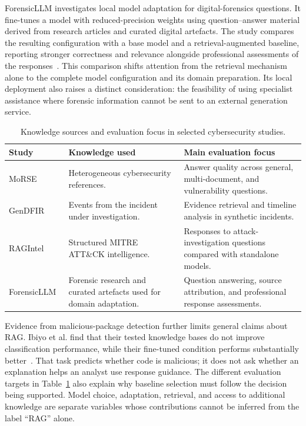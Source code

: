 ForensicLLM investigates local model adaptation for digital-forensics questions. It fine-tunes a model with reduced-precision weights using question--answer material derived from research articles and curated digital artefacts. The study compares the resulting configuration with a base model and a retrieval-augmented baseline, reporting stronger correctness and relevance alongside professional assessments of the responses~\cite{ref030}. This comparison shifts attention from the retrieval mechanism alone to the complete model configuration and its domain preparation. Its local deployment also raises a distinct consideration: the feasibility of using specialist assistance where forensic information cannot be sent to an external generation service.

\begin{table}[htbp]
\centering\small
\caption{Knowledge sources and evaluation focus in selected cybersecurity studies.}
\label{tab:literature-systems}
\begin{tabularx}{\textwidth}{@{}>{\raggedright\arraybackslash}p{}>{\raggedright\arraybackslash}X>{\raggedright\arraybackslash}X@{}}
\toprule
Study & Knowledge used & Main evaluation focus \\
\midrule
MoRSE~\cite{ref001} & Heterogeneous cybersecurity references. & Answer quality across general, multi-document, and vulnerability questions. \\
GenDFIR~\cite{ref011} & Events from the incident under investigation. & Evidence retrieval and timeline analysis in synthetic incidents. \\
RAGIntel~\cite{ref033} & Structured MITRE ATT\&CK intelligence. & Responses to attack-investigation questions compared with standalone models. \\
ForensicLLM~\cite{ref030} & Forensic research and curated artefacts used for domain adaptation. & Question answering, source attribution, and professional response assessments. \\
\bottomrule
\end{tabularx}
\end{table}

Evidence from malicious-package detection further limits general claims about RAG. Ibiyo et al. find that their tested knowledge bases do not improve classification performance, while their fine-tuned condition performs substantially better~\cite{ref023}. That task predicts whether code is malicious; it does not ask whether an explanation helps an analyst use response guidance. The different evaluation targets in Table~\ref{tab:literature-systems} also explain why baseline selection must follow the decision being supported. Model choice, adaptation, retrieval, and access to additional knowledge are separate variables whose contributions cannot be inferred from the label ``RAG'' alone.

